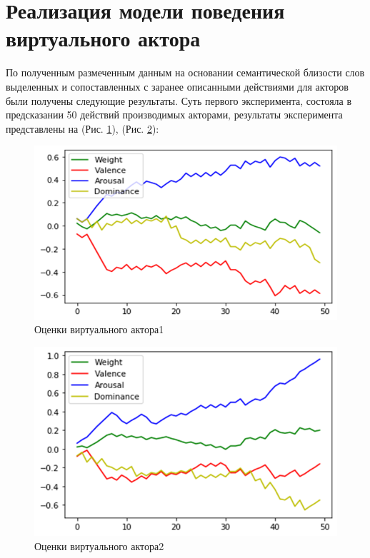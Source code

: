 \section{Реализация модели поведения виртуального актора}

По полученным размеченным данным на основании семантической близости слов выделенных и сопоставленных с заранее описанными действиями для акторов 
были получены следующие результаты. 
Суть первого эксперимента, состояла в предсказании 50 действий производимых  акторами, результаты эксперимента представлены на (Рис. \ref{pic:ris17}), (Рис. \ref{pic:ris18}):
\begin{figure}[H]
\includegraphics[width=0.75\columnwidth]{./img/ris17.png}
\centering
\caption{Оценки виртуального актора1}
\label{pic:ris17}
\end{figure}

\begin{figure}[H]
\includegraphics[width=0.75\columnwidth]{./img/ris18.png}
\centering
\caption{Оценки виртуального актора2}
\label{pic:ris18}
\end{figure}

